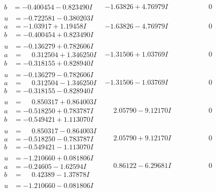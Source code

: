 \documentclass[1p]{elsarticle_modified}
\theoremstyle{definition}
\begin{document}
$$\begin{array}{c|c|c}
\begin{aligned}
b &= -0.400454 - 0.823490 I\end{aligned}
 & -1.63826 + 4.76979 I & \phantom{-0.000000 } 0 \\ \hline\begin{aligned}
u &= -0.722581 - 0.380203 I \\
a &= -1.03917 + 1.19458 I \\
b &= -0.400454 + 0.823490 I\end{aligned}
 & -1.63826 - 4.76979 I & \phantom{-0.000000 } 0 \\ \hline\begin{aligned}
u &= -0.136279 + 0.782606 I \\
a &= \phantom{-}0.312504 + 1.346250 I \\
b &= -0.318155 + 0.828940 I\end{aligned}
 & -1.31506 + 1.03769 I & \phantom{-0.000000 } 0 \\ \hline\begin{aligned}
u &= -0.136279 - 0.782606 I \\
a &= \phantom{-}0.312504 - 1.346250 I \\
b &= -0.318155 - 0.828940 I\end{aligned}
 & -1.31506 - 1.03769 I & \phantom{-0.000000 } 0 \\ \hline\begin{aligned}
u &= \phantom{-}0.850317 + 0.864003 I \\
a &= -0.518250 + 0.783787 I \\
b &= -0.549421 + 1.113070 I\end{aligned}
 & \phantom{-}2.05790 - 9.12170 I & \phantom{-0.000000 } 0 \\ \hline\begin{aligned}
u &= \phantom{-}0.850317 - 0.864003 I \\
a &= -0.518250 - 0.783787 I \\
b &= -0.549421 - 1.113070 I\end{aligned}
 & \phantom{-}2.05790 + 9.12170 I & \phantom{-0.000000 } 0 \\ \hline\begin{aligned}
u &= -1.210660 + 0.081806 I \\
a &= -0.24605 - 1.62594 I \\
b &= \phantom{-}0.42389 - 1.37878 I\end{aligned}
 & \phantom{-}0.86122 - 6.29681 I & \phantom{-0.000000 } 0 \\ \hline\begin{aligned}
u &= -1.210660 - 0.081806 I \\

\end{aligned}
\end{array}$$
\end{document}
